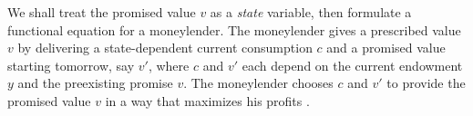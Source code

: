 We shall treat the promised value $v$ as a {\it state\/}
variable, then  formulate a functional equation for a moneylender. The
moneylender gives a prescribed value $v$ by delivering a
state-dependent current consumption $c$ and a promised value
starting tomorrow, say $v'$, where $c$ and $v'$ each depend on the
current endowment $y$ and the preexisting promise $v$.  The
moneylender chooses $c$ and $v'$ to  provide the promised value $v$ in  a way that maximizes his profits
.






